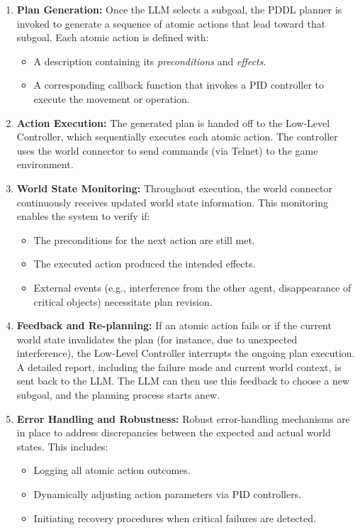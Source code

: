 \documentclass{article}
\begin{document}
\begin{enumerate}
    \item \textbf{Plan Generation:}  
    Once the LLM selects a subgoal, the PDDL planner is invoked to generate a sequence of atomic actions that lead toward that subgoal. Each atomic action is defined with:
    \begin{itemize}
        \item A description containing its \emph{preconditions} and \emph{effects}.
        \item A corresponding callback function that invokes a PID controller to execute the movement or operation.
    \end{itemize}
    
    \item \textbf{Action Execution:}  
    The generated plan is handed off to the Low-Level Controller, which sequentially executes each atomic action. The controller uses the world connector to send commands (via Telnet) to the game environment.
    
    \item \textbf{World State Monitoring:}  
    Throughout execution, the world connector continuously receives updated world state information. This monitoring enables the system to verify if:
    \begin{itemize}
        \item The preconditions for the next action are still met.
        \item The executed action produced the intended effects.
        \item External events (e.g., interference from the other agent, disappearance of critical objects) necessitate plan revision.
    \end{itemize}
    
    \item \textbf{Feedback and Re-planning:}  
    If an atomic action fails or if the current world state invalidates the plan (for instance, due to unexpected interference), the Low-Level Controller interrupts the ongoing plan execution. A detailed report, including the failure mode and current world context, is sent back to the LLM. The LLM can then use this feedback to choose a new subgoal, and the planning process starts anew.
    
    \item \textbf{Error Handling and Robustness:}  
    Robust error-handling mechanisms are in place to address discrepancies between the expected and actual world states. This includes:
    \begin{itemize}
        \item Logging all atomic action outcomes.
        \item Dynamically adjusting action parameters via PID controllers.
        \item Initiating recovery procedures when critical failures are detected.
    \end{itemize}
\end{enumerate}
\end{document}

